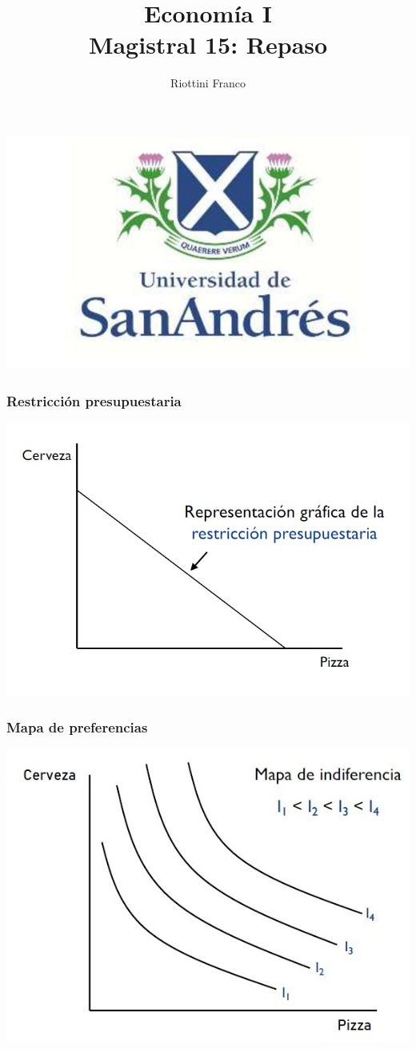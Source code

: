 \documentclass{beamer}
\title[Economía I]{Economía I \vspace{4mm}
\\ Magistral 15: Repaso}
\date{}
\author[Riottini]{Riottini Franco}
\institute[]{Universidad de San Andrés}
\begin{document}
\begin{frame}
    \titlepage
    \centering
    \includegraphics[scale=0.2]{../Figures/logoUDESA.jpg} 
\end{frame}

\begin{frame}
    \frametitle{Restricción presupuestaria}
    \centering
    \includegraphics[scale=0.6]{../Figures/Tema_02.4_rp2.jpg}
\end{frame}

\begin{frame}
    \frametitle{Mapa de preferencias}
    \centering
    \includegraphics[scale=0.6]{../Figures/Tema_02.16_rp14.jpg}
\end{frame}
\end{document}
